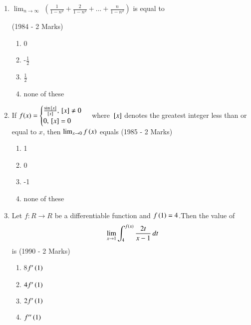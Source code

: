 \documentclass[journal,12pt,onecolumn]{IEEEtran}
\theoremstyle{remark}
\begin{document}
\begin{enumerate}
\item $\lim_{n\to \infty}$
      $\left(
      \frac{1}{1-n^2} + \frac{2}{1-n^2} +...+ \frac{n}{1-n^2}
       \right)$ is equal to
       
	     \hfill{(1984 - 2 Marks)}
	     \begin{multicols}{2}
                 \begin{enumerate}
                    \item 0
                    \item -$\frac{1}{2}$
                    \item $\frac{1}{2}$
                    \item none of these
             
                 \end{enumerate}
	     \end{multicols}	     

\item If $f(x)=\begin{cases}
\frac{\sin{}\left[x\right]}{{}\left[x\right]}, {}\left[x\right]\neq 0\\ 0 ,  {}\left[x\right]=0\end{cases}$   where ${}\left[x\right]$ denotes the greatest integer less than or equal to $x$, then $\lim_{x\to 0}f\left(x\right)$ equals
    \hfill                {(1985 - 2 Marks)}
 \begin{multicols}{2}		     
    \begin{enumerate}
        \item 1
        \item 0
        \item -1
        \item none of these
    \end{enumerate}
 \end{multicols}	

\item Let $f:R\to R$ be a differentiable function and $f\left(1\right)=4$.Then the value of
\begin{align}
 \: \lim_{x\to 1}\int_{4}^{f\left(x\right)}\frac{2t}{x-1}\,dt 
 \end{align}
 is
\hfill{(1990 - 2 Marks)}
 \begin{multicols}{2}
  \begin{enumerate}
     \item 8$f^{\prime}\left(1\right)$
     \item $4f^{\prime}\left(1\right)$
     \item $2f^{\prime}\left(1\right)$
     \item $f^{\prime\prime}\left(1\right)$
     

\end{enumerate}
\end{multicols}
\end{enumerate}
\end{document}
